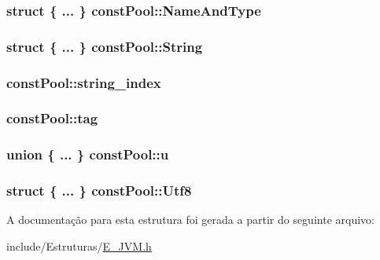 \subsubsection[{Name\+And\+Type}]{\setlength{\rightskip}{0pt plus 5cm}struct \{ ... \}   const\+Pool\+::\+Name\+And\+Type}\label{structconst_pool_a727268ed0e1405a5eaab1aa5ad3cba74}
\hypertarget{structconst_pool_ab014bc483e8b8803ecf0c288495b5a5e}{}
\subsubsection[{String}]{\setlength{\rightskip}{0pt plus 5cm}struct \{ ... \}   const\+Pool\+::\+String}\label{structconst_pool_ab014bc483e8b8803ecf0c288495b5a5e}
\hypertarget{structconst_pool_a1bb9e94f3cb54a3e19bde3d251379ac0}{}
\subsubsection[{string\+\_\+index}]{ const\+Pool\+::string\+\_\+index}\label{structconst_pool_a1bb9e94f3cb54a3e19bde3d251379ac0}
\hypertarget{structconst_pool_a876197bb013e214c071ab56d1de8ed25}{}
\subsubsection[{tag}]{ const\+Pool\+::tag}\label{structconst_pool_a876197bb013e214c071ab56d1de8ed25}
\hypertarget{structconst_pool_ab327fbd2fec182d523b180c4d941d7f5}{}
\subsubsection[{u}]{\setlength{\rightskip}{0pt plus 5cm}union \{ ... \}   const\+Pool\+::u}\label{structconst_pool_ab327fbd2fec182d523b180c4d941d7f5}
\hypertarget{structconst_pool_ab18ebde1a84b99d3dc0b70b1df46be82}{}
\subsubsection[{Utf8}]{\setlength{\rightskip}{0pt plus 5cm}struct \{ ... \}   const\+Pool\+::\+Utf8}\label{structconst_pool_ab18ebde1a84b99d3dc0b70b1df46be82}


A documentação para esta estrutura foi gerada a partir do seguinte arquivo\+:\begin{DoxyCompactItemize}
\item 
include/\+Estruturas/\hyperlink{_e___j_v_m_8h}{E\+\_\+\+J\+V\+M.\+h}\end{DoxyCompactItemize}
